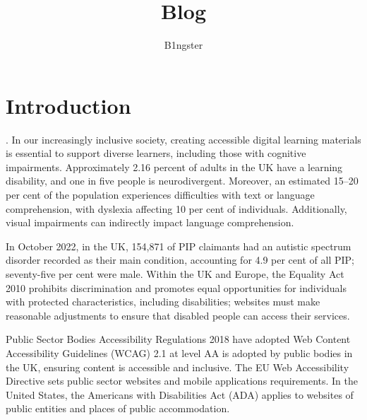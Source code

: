 \documentclass{article}
\title{Blog}
\author{B1ngster}
\date{}
\begin{document}
\begin{titlepage}
    \noindent %
        \vfill
        \vfill
\end{titlepage}


\newpage
\tableofcontents
\newpage


\section{Introduction}
. 
In our increasingly inclusive society, creating accessible digital learning materials is essential to support diverse learners, including those with cognitive impairments. Approximately 2.16 percent of adults in the UK have a learning disability, and one in five people is neurodivergent. Moreover, an estimated 15–20 per cent of the population experiences difficulties with text or language comprehension, with dyslexia affecting 10 per cent of individuals. Additionally, visual impairments can indirectly impact language comprehension.

In October 2022, in the UK,  154,871 of PIP claimants had an autistic spectrum disorder recorded as their main condition, accounting for 4.9 per cent of all PIP; seventy-five per cent were male. Within the UK and Europe, the Equality Act 2010 prohibits discrimination and promotes equal opportunities for individuals with protected characteristics, including disabilities; websites must make reasonable adjustments to ensure that disabled people can access their services. 

Public Sector Bodies Accessibility Regulations 2018 have adopted Web Content Accessibility Guidelines (WCAG) 2.1 at level AA is adopted by public bodies in the UK, ensuring content is accessible and inclusive. The EU Web Accessibility Directive sets public sector websites and mobile applications requirements. In the United States, the Americans with Disabilities Act (ADA) applies to websites of public entities and places of public accommodation. 
\end{document}
